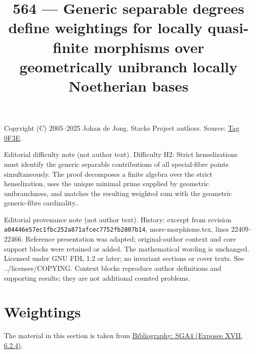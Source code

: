 \documentclass{amsart}
\theoremstyle{plain}
\theoremstyle{definition}
\theoremstyle{remark}
\numberwithin{equation}{subsection}
\begin{document}
\title[Stacks Project, Tag 0F3E]{564 --- Generic separable degrees define weightings for locally quasi-finite morphisms over geometrically unibranch locally Noetherian bases}
\maketitle
\noindent Copyright (C) 2005--2025 Johan de Jong. Stacks Project authors. Source: \href{https://stacks.math.columbia.edu/tag/0F3E}{Tag 0F3E}.

\noindent Editorial difficulty note (not author text). Difficulty H2: Strict henselizations must identify the generic separable contributions of all special-fibre points simultaneously. The proof decomposes a finite algebra over the strict henselization, uses the unique minimal prime supplied by geometric unibranchness, and matches the resulting weighted sum with the geometric generic-fibre cardinality..

\noindent Editorial provenance note (not author text). History: excerpt from revision \texttt{a0444\allowbreak 6e57e\allowbreak c1fbc\allowbreak 252a8\allowbreak 71afc\allowbreak ec775\allowbreak 2fb28\allowbreak 07b14}, more-morphisms.tex, lines 22409--22466. Reference presentation was adapted; original-author context and core support blocks were retained or added. The mathematical wording is unchanged. Licensed under GNU FDL 1.2 or later; no invariant sections or cover texts. See ../licenses/COPYING. Context blocks reproduce author definitions and supporting results; they are not additional counted problems.

\section{Weightings}
\label{section-weightings}

\noindent
The material in this section is taken from \href{https://stacks.math.columbia.edu/bibliography}{Bibliography: SGA4 (Exposee XVII, 6.2.4)}.
\end{document}
